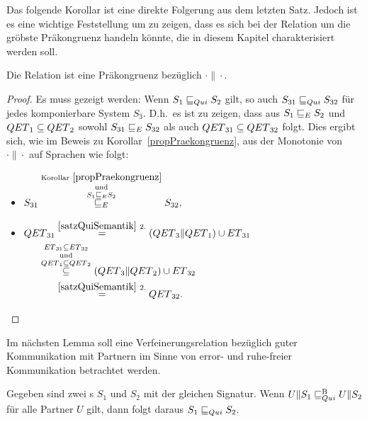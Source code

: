 Das folgende Korollar ist eine direkte Folgerung aus dem letzten Satz.
Jedoch ist es eine wichtige Feststellung um zu zeigen, dass es sich bei der
Relation \QRel{} um die gröbste Präkongruenz handeln könnte, die in diesem
Kapitel charakterisiert werden soll.

\begin{kor}
\label{propQuiPrae}
  Die Relation \QRel{} ist eine Präkongruenz bezüglich $\cdot\|\cdot$.
\end{kor}

\begin{proof}
  Es muss gezeigt werden: Wenn $S_1\sqsubseteq _{Qui} S_2$ gilt, so auch
  $S_{31}\sqsubseteq _{Qui} S_{32}$ für jedes komponierbare System $S_3$. D.h.\ es ist zu zeigen, dass aus
  $S_1\sqsubseteq _E S_2$ und $QET{}_1\subseteq QET{}_2$ sowohl $S_{31}\sqsubseteq _E S_{32}$ als
  auch $QET{}_{31}\subseteq QET{}_{32}$ folgt. Dies ergibt sich, wie im Beweis
  zu Korollar~\ref{propPraekongruenz}, aus der Monotonie von $\cdot\|\cdot$
  auf Sprachen wie folgt:
  \begin{itemize}
    \item $\begin{aligned}[t]
        S_{31} \overset{\mathrm{Korollar}
        ~\ref{propPraekongruenz}}{\overset{\mathrm{und}}{\overset{S_1\sqsubseteq _E
    S_2}{\sqsubseteq _E}}} S_{32},
    \end{aligned}$
    \item $\begin{aligned}[t]
        \QT{}_{31} &\overset{\ref{satzQuiSemantik}~2.}{=}
        (\QT{}_3\|\QT{}_1)\cup \ET{}_{31}\\
        &\hspace{-0.6cm}\overset{\ET{}_{31}\subseteq
      \ET{}_{32}}{\overset{\mathrm{und}}{\overset{\QT{}_1\subseteq
      \QT{}_2}{\subseteq}}} (\QT{}_3\|\QT{}_2) \cup \ET{}_{32}\\
        &\overset{\ref{satzQuiSemantik}~2.}{=} \QT{}_{32}.
    \end{aligned}$
  \vspace*{-0.7cm}
  \end{itemize}
\end{proof}

Im nächsten Lemma soll eine Verfeinerungsrelation bezüglich guter Kommunikation
mit Partnern im Sinne von error- und ruhe-freier Kommunikation betrachtet
werden.

\begin{lem}
\label{lemQuiVerfeinerung}
  Gegeben sind zwei \EIO{}s $S_1$ und $S_2$ mit der gleichen Signatur. Wenn
  $U\|S_1\sqsubseteq _{Qui}^\mathrm{B} U\|S_2$ für alle Partner $U$ gilt, dann folgt daraus $S_1\sqsubseteq _{Qui}
  S_2$.
\end{lem}

